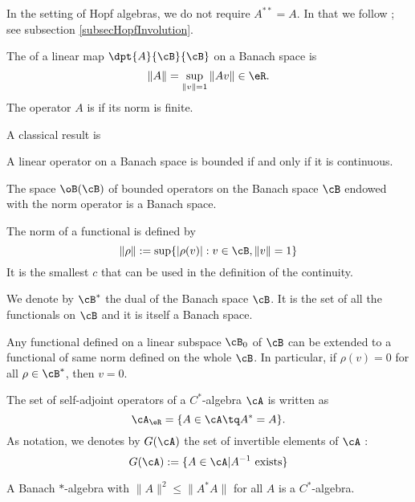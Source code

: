 \begin{remark}
    In the setting of Hopf algebras, we do not require \( A^{**}=A\). In that we follow \cite{SoibelmanI}; see subsection \ref{subsecHopfInvolution}.
\end{remark}

\begin{definition}
The  of a linear map $\dpt{A}{\cB}{\cB}$ on a Banach space is 
\[
   \|A\|=\sup_{\|v\|=1}\|Av\|\in\eR.
\]
The operator $A$ is  if its norm is finite. \label{def:normappl}
\end{definition}

A classical result is
\begin{proposition} 
A linear operator on a Banach space is bounded if and only if it is continuous.\label{prop:cont_born}
\end{proposition}

\begin{proposition}
The space $\oB(\cB)$ of bounded operators on the Banach space $\cB$ endowed with the norm operator is a Banach space. 
\end{proposition}

The norm of a functional is defined by
\[
   \|\rho\|:=\sup\{ |\rho(v)|:v\in\cB,\|v\|=1  \}
\]
It is the smallest $c$ that can be used in the definition of the continuity.

We denote by $\cB^*$ the dual of the Banach space $\cB$. It is the set of all the functionals on $\cB$ and it is itself a Banach space.

\begin{theorem} \label{tho:hahnBanach}
Any functional defined on a linear subspace $\cB_0$ of $\cB$ can be extended to a functional of same norm defined on the whole $\cB$. In particular, if $\rho(v)=0$ for all $\rho\in\cB^*$, then $v=0$.
\end{theorem}



The set of self-adjoint operators of a $C^*$-algebra $\cA$ is written as 
\[
  \cA_{\eR}=\{A\in\cA\tq A^*=A\}.
\]
As notation, we denotes by $G(\cA)$ the set of invertible elements of $\cA$ :
\[
   G(\cA):=\{A\in\cA|A^{-1}\text{ exists}\}
\]

\begin{lemma}
A Banach $*$-algebra with $\|A\|^2\leq\|A^*A\|$ for all $A$ is a $C^*$-algebra.\label{lem:STARAlC}
\end{lemma}

